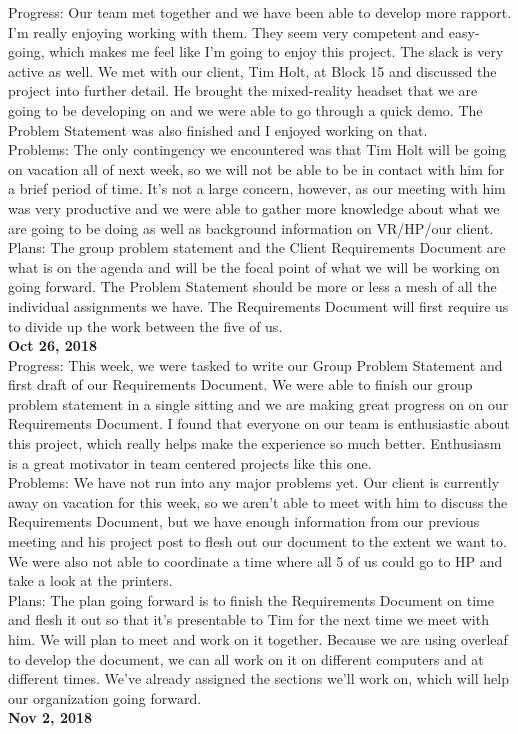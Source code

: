 Progress: 	Our team met together and we have been able to develop more rapport. I'm really enjoying working with them. They seem very competent and easy-going, which makes me feel like I'm going to enjoy this project. The slack is very active as well. We met with our client, Tim Holt, at Block 15 and discussed the project into further detail. He brought the mixed-reality headset that we are going to be developing on and we were able to go through a quick demo. The Problem Statement was also finished and I enjoyed working on that.  \\
Problems: 	The only contingency we encountered was that Tim Holt will be going on vacation all of next week, so we will not be able to be in contact with him for a brief period of time. It's not a large concern, however, as our meeting with him was very productive and we were able to gather more knowledge about what we are going to be doing as well as background information on VR/HP/our client. \\
Plans: 	The group problem statement and the Client Requirements Document are what is on the agenda and will be the focal point of what we will be working on going forward. The Problem Statement should be more or less a mesh of all the individual assignments we have. The Requirements Document will first require us to divide up the work between the five of us.\\
\textbf{Oct 26, 2018}\\
Progress: 	This week, we were tasked to write our Group Problem Statement and first draft of our Requirements Document. We were able to finish our group problem statement in a single sitting and we are making great progress on on our Requirements Document. I found that everyone on our team is enthusiastic about this project, which really helps make the experience so much better. Enthusiasm is a great motivator in team centered projects like this one. \\
Problems: 	We have not run into any major problems yet. Our client is currently away on vacation for this week, so we aren't able to meet with him to discuss the Requirements Document, but we have enough information from our previous meeting and his project post to flesh out our document to the extent we want to. We were also not able to coordinate a time where all 5 of us could go to HP and take a look at the printers.\\
Plans: 	The plan going forward is to finish the Requirements Document on time and flesh it out so that it's presentable to Tim for the next time we meet with him. We will plan to meet and work on it together. Because we are using overleaf to develop the document, we can all work on it on different computers and at different times. We've already assigned the sections we'll work on, which will help our organization going forward.\\
\textbf{Nov 2, 2018}\\

